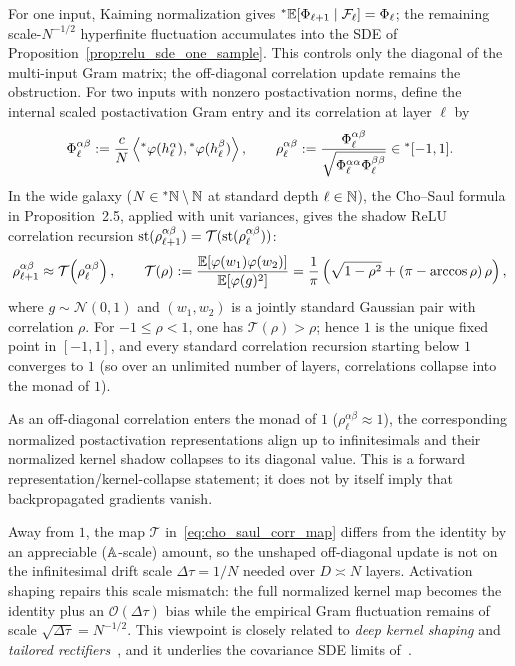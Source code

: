 For one input, Kaiming normalization gives ${}^*\mathbb{E}[\Phi_{\ell+1} \mid \mathcal{F}_\ell] = \Phi_\ell$; the remaining scale-$N^{-1/2}$ hyperfinite fluctuation accumulates into the SDE of Proposition~\ref{prop:relu_sde_one_sample}. This controls only the diagonal of the multi-input Gram matrix; the off-diagonal correlation update remains the obstruction. For two inputs with nonzero postactivation norms, define the internal scaled postactivation Gram entry and its correlation at layer $\ell$ by
\begin{equation}\label{eq:relu_gram_corr}
\Phi_\ell^{\alpha\beta} := \frac{c}{N}\left\langle {}^*\varphi(h_\ell^\alpha), {}^*\varphi(h_\ell^\beta) \right\rangle, \qquad \rho_\ell^{\alpha\beta} := \frac{\Phi_\ell^{\alpha\beta}}{\sqrt{\Phi_\ell^{\alpha\alpha}\Phi_\ell^{\beta\beta}}} \in {}^*[-1, 1].
\end{equation}
In the wide galaxy ($N \in {}^*\mathbb{N} \setminus \mathbb{N}$ at standard depth $\ell \in \mathbb{N}$), the Cho--Saul formula in Proposition~2.5, applied with unit variances, gives the shadow ReLU correlation recursion $\operatorname{st}(\rho_{\ell+1}^{\alpha\beta}) = \mathcal{T}(\operatorname{st}(\rho_\ell^{\alpha\beta}))$:
\begin{equation}\label{eq:cho_saul_corr_map}
\rho_{\ell+1}^{\alpha\beta} \approx \mathcal{T}\!\left(\rho_\ell^{\alpha\beta}\right), \qquad \mathcal{T}(\rho) := \frac{\mathbb{E}[\varphi(w_1)\varphi(w_2)]}{\mathbb{E}[\varphi(g)^2]} = \frac{1}{\pi}\left(\sqrt{1 - \rho^2} + (\pi - \arccos\rho)\,\rho\right),
\end{equation}
where $g \sim \mathcal{N}(0, 1)$ and $(w_1, w_2)$ is a jointly standard Gaussian pair with correlation $\rho$. For $-1 \le \rho < 1$, one has $\mathcal{T}(\rho) > \rho$; hence $1$ is the unique fixed point in $[-1, 1]$, and every standard correlation recursion starting below $1$ converges to $1$ (so over an unlimited number of layers, correlations collapse into the monad of $1$).

\begin{remark}\label{rem:kernel_collapse}
As an off-diagonal correlation enters the monad of $1$ ($\rho_\ell^{\alpha\beta} \approx 1$), the corresponding normalized postactivation representations align up to infinitesimals and their normalized kernel shadow collapses to its diagonal value. This is a forward representation/kernel-collapse statement; it does not by itself imply that backpropagated gradients vanish.
\end{remark}

Away from $1$, the map $\mathcal{T}$ in~\eqref{eq:cho_saul_corr_map} differs from the identity by an appreciable ($\mathbb{A}$-scale) amount, so the unshaped off-diagonal update is not on the infinitesimal drift scale $\Delta\tau = 1/N$ needed over $D \asymp N$ layers. Activation shaping repairs this scale mismatch: the full normalized kernel map becomes the identity plus an $\mathcal{O}(\Delta\tau)$ bias while the empirical Gram fluctuation remains of scale $\sqrt{\Delta\tau} = N^{-1/2}$. This viewpoint is closely related to \emph{deep kernel shaping} and \emph{tailored rectifiers}~\cite{martens2021rapid,zhang2022deep}, and it underlies the covariance SDE limits of~\cite[Sections~2.3--3.2]{li2022neural}.

